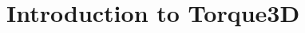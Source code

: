 

\newif\ifdraftmode
\draftmodetrue





\setcounter{chapter}{-1}


	
	\graphicspath{{figures/}}
	
	
	
	

	\tableofcontents

	
	\graphicspath{{sections/introduction/figures/}}
	


	\part{Introduction to Torque3D}
	\ifdraftmode
		\graphicspath{{sections/manual/example/figures/}}
		
	\fi
	
